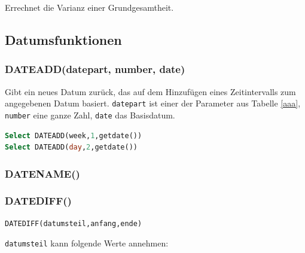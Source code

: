 \documentclass[12pt,ngerman,a4paper,index=totoc,twoside]{scrartcl}
\newcommand{\hint}[1]{\textcolor{hint}{\texttt{#1}}}
\newcommand{\sql}[1]{\texttt{#1}}
\newcommand{\lwidth}{0.75}
\begin{document}
Errechnet die Varianz einer Grundgesamtheit.

\subsection{Datumsfunktionen}

\subsubsection{DATEADD(datepart, number, date)} 

Gibt ein neues Datum zurück, das auf dem Hinzufügen eines Zeitintervalls zum angegebenen Datum basiert. \hint{datepart} ist einer der Parameter aus Tabelle \ref{aaa}, \hint{number} eine ganze Zahl, \hint{date} das Basisdatum.
 
\begin{center}
\begin{minipage}{\lwidth\textwidth}
\begin{lstlisting}[language={SQL},caption={Beispiel für \sql{DATEADD}},label={funktionen:dateadd1}]
Select DATEADD(week,1,getdate())
Select DATEADD(day,2,getdate())
\end{lstlisting}
\end{minipage}
\end{center}


\subsubsection{DATENAME()} 

\subsubsection{DATEDIFF()} 

\begin{center}
\begin{minipage}{\lwidth\textwidth}
\begin{lstlisting}[language={SQL},caption={Beispiel für \sql{DATEDIFF}},label={funktionen:datediff1}]
DATEDIFF(datumsteil,anfang,ende) 
\end{lstlisting}
\end{minipage}
\end{center}

\sql{datumsteil} kann folgende Werte annehmen:
\end{document}

